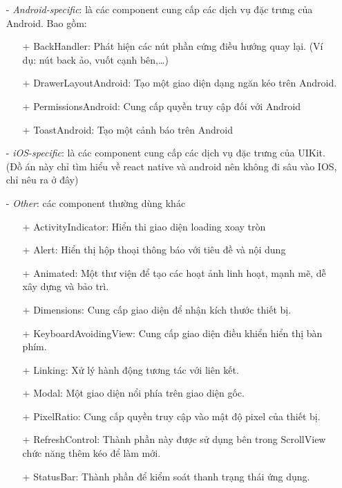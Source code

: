 \begin{enumerate}
\begin{enumerate}
\begin{enumerate}
            \end{enumerate}
            \item[-] {\textit{Android-specific}}: là các component cung cấp các dịch vụ đặc trưng của Android. Bao gồm:
            \begin{enumerate}
                \item[+] BackHandler: Phát hiện các nút phần cứng điều hướng quay lại. (Ví dụ: nút back ảo, vuốt cạnh bên,\dots)
                \item[+] DrawerLayoutAndroid: Tạo một giao diện dạng ngăn kéo trên Android.
                \item[+] PermissionsAndroid: Cung cấp quyền truy cập đối với Android
                \item[+] ToastAndroid: Tạo một cảnh báo trên Android
            \end{enumerate}
            \item[-] {\textit{iOS-specific}}: là các component cung cấp các dịch vụ đặc trưng của UIKit. (Đồ án này chỉ tìm hiểu về react native và android nên không đi sâu vào IOS, chỉ nêu ra ở đây) 
            \item[-] {\textit{Other}}: các component thường dùng khác
            \begin{enumerate}
                \item[+] ActivityIndicator: Hiển thi giao diện loading xoay tròn
                \item[+] Alert: Hiển thị hộp thoại thông báo với tiêu đề và nội dung
                \item[+] Animated: Một thư viện để tạo các hoạt ảnh linh hoạt, mạnh mẽ, dễ xây dựng và bảo trì.
                \item[+] Dimensions: Cung cấp giao diện để nhận kích thước thiết bị.
                \item[+] KeyboardAvoidingView: Cung cấp giao diện điều khiển hiển thị bàn phím.
                \item[+] Linking: Xử lý hành động tương tác với liên kết.
                \item[+] Modal: Một giao diện nổi phía trên giao diện gốc.
                \item[+] PixelRatio: Cung cấp quyền truy cập vào mật độ pixel của thiết bị.
                \item[+] RefreshControl: Thành phần này được sử dụng bên trong ScrollView chức năng thêm kéo để làm mới.
                \item[+] StatusBar: Thành phần để kiểm soát thanh trạng thái ứng dụng.

\end{enumerate}
\end{enumerate}
\end{enumerate}
